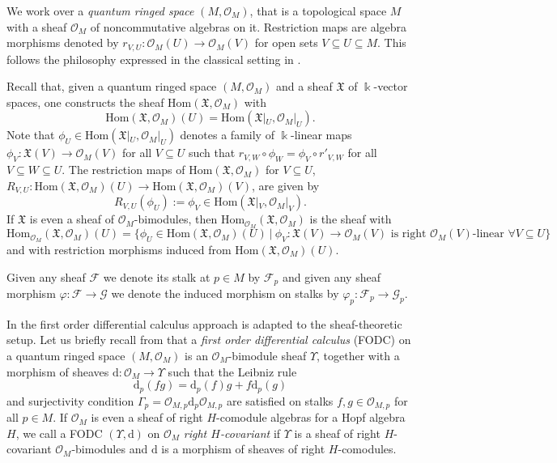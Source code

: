 \documentclass{article}
\theoremstyle{definition}
\newcommand{\cO}{{\mathcal{O}}}
\begin{document}
We work over a {\it quantum ringed space} $(M,\cO_M)$, that is a topological space $M$ with a sheaf $\cO_M$ of noncommutative algebras on it. Restriction maps are algebra morphisms denoted by $r_{V,U}\colon\mathcal{O}_M(U)\to\mathcal{O}_M(V)$ for open sets $V\subseteq U\subseteq M$.
This follows the philosophy expressed in the classical setting in \cite[3, Section 16 (page 28)]{egaIV}. 

Recall that, given a quantum ringed space $(M,\mathcal{O}_M)$ and a sheaf $\mathfrak{X}$ of $\Bbbk$-vector spaces, one constructs the sheaf $\mathrm{Hom}(\mathfrak{X},\mathcal{O}_M)$ with 
$$
\mathrm{Hom}(\mathfrak{X},\mathcal{O}_M)(U)=\mathrm{Hom}(\mathfrak{X}|_U,\mathcal{O}_M|_U).
$$ 
Note that $\phi_U\in\mathrm{Hom}(\mathfrak{X}|_U,\mathcal{O}_M|_U)$ denotes a family of $\Bbbk$-linear maps $\phi_V\colon\mathfrak{X}(V)\to\mathcal{O}_M(V)$ for all $V\subseteq U$ such that $r_{V,W}\circ\phi_W=\phi_V\circ r'_{V,W}$ for all $V\subseteq W\subseteq U$.
The restriction maps of $\mathrm{Hom}(\mathfrak{X},\mathcal{O}_M)$ for $V\subseteq U$, $R_{V,U}\colon\mathrm{Hom}(\mathfrak{X},\mathcal{O}_M)(U)\to\mathrm{Hom}(\mathfrak{X},\mathcal{O}_M)(V)$, are given by
$$
R_{V,U}(\phi_U):=\phi_V\in\mathrm{Hom}(\mathfrak{X}|_V,\mathcal{O}_M|_V).
$$
If $\mathfrak{X}$ is even a sheaf of $\mathcal{O}_M$-bimodules, then $\mathrm{Hom}_{\mathcal{O}_M}(\mathfrak{X},\mathcal{O}_M)$ is the sheaf with
$$
\mathrm{Hom}_{\mathcal{O}_M}(\mathfrak{X},\mathcal{O}_M)(U)=\{\phi_U\in\mathrm{Hom}(\mathfrak{X},\mathcal{O}_M)(U)~|~\phi_V\colon\mathfrak{X}(V)\to\mathcal{O}_M(V)\text{ is right $\mathcal{O}_M(V)$-linear }\forall V\subseteq U\}
$$
and with restriction morphisms induced from $\mathrm{Hom}(\mathfrak{X},\mathcal{O}_M)(U)$.

Given any sheaf $\mathcal{F}$ we denote its stalk at $p\in M$ by $\mathcal{F}_p$ and given any sheaf morphism $\varphi\colon\mathcal{F}\to\mathcal{G}$ we denote the induced morphism on stalks by $\varphi_p\colon\mathcal{F}_p\to\mathcal{G}_p$.

In \cite{aflw} the first order differential calculus approach is adapted to the sheaf-theoretic setup. Let us briefly recall from \cite[Definition 4.5]{aflw} that a \textit{first order differential calculus} (FODC) on a quantum ringed space $(M,\mathcal{O}_M)$ is an $\mathcal{O}_M$-bimodule sheaf $\Upsilon$, together with a morphism of sheaves $\mathrm{d}\colon\mathcal{O}_M\to\Upsilon$ such that the Leibniz rule
$$
\mathrm{d}_p(fg)=\mathrm{d}_p(f)g+f\mathrm{d}_p(g)
$$
and surjectivity condition $\Gamma_p=\mathcal{O}_{M,p}\mathrm{d}_p\mathcal{O}_{M,p}$ are satisfied on stalks $f,g\in\mathcal{O}_{M,p}$ for all $p\in M$. If $\mathcal{O}_M$ is even a sheaf of right $H$-comodule algebras for a Hopf algebra $H$, we call a FODC $(\Upsilon,\mathrm{d})$ on $\mathcal{O}_M$ \textit{right $H$-covariant} if $\Upsilon$ is a sheaf of right $H$-covariant $\mathcal{O}_M$-bimodules and $\mathrm{d}$ is a morphism of sheaves of right $H$-comodules.
\end{document}
